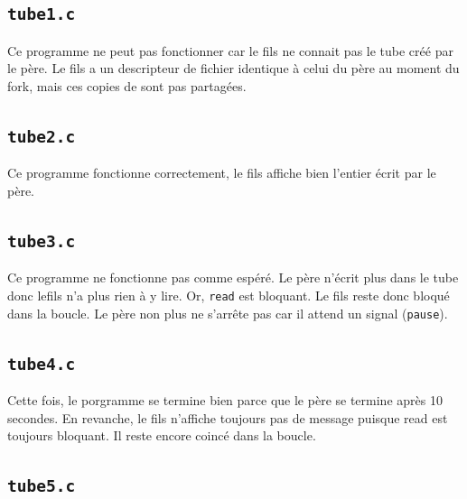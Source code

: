 \documentclass{article}
\begin{document}
\subsection{\texttt{tube1.c}}

Ce programme ne peut pas fonctionner car le fils ne connait pas le tube créé par le père. Le fils a un descripteur de fichier identique à celui du père au moment du fork, mais ces copies de sont pas partagées.

\subsection{\texttt{tube2.c}}

Ce programme fonctionne correctement, le fils affiche bien l'entier écrit par le père.

\subsection{\texttt{tube3.c}}

Ce programme ne fonctionne pas comme espéré. Le père n'écrit plus dans le tube donc lefils n'a plus rien à y lire. Or, \texttt{read} est bloquant. Le fils reste donc bloqué dans la boucle. Le père non plus ne s'arrête pas car il attend un signal (\texttt{pause}).

\subsection{\texttt{tube4.c}}

Cette fois, le porgramme se termine bien parce que le père se termine après 10 secondes. En revanche, le fils n'affiche toujours pas de message puisque read est toujours bloquant. Il reste encore coincé dans la boucle.

\subsection{\texttt{tube5.c}}
\end{document}
